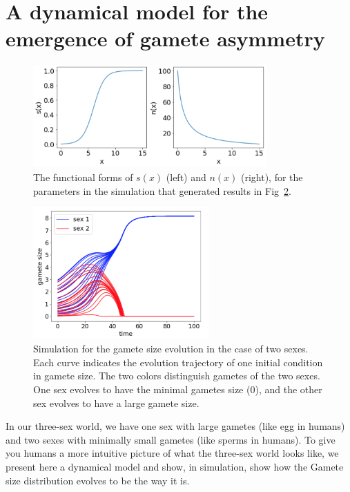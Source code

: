 

\section{A dynamical model for the emergence of gamete asymmetry}


\begin{figure}[htb!]
    \centering
    \includegraphics[width = 0.8\textwidth]{vickysFigs/2_sex_funForm}
    \caption{The functional forms of $s(x)$ (left) and $n(x)$ (right), for the parameters in the simulation that generated results in Fig~\ref{fig:2sexRun1}.}
    \label{fig:2sexFun1}
\end{figure}

\begin{figure}[htb!]
    \centering
    \includegraphics[width = 0.6\textwidth]{vickysFigs/2_sex_run1}
    \caption{Simulation for the gamete size evolution in the case of two sexes. Each curve indicates the evolution trajectory of one initial condition in gamete size. The two colors distinguish gametes of the two sexes. One sex evolves to have the minimal gametes size ($0$), and the other sex evolves to have a large gamete size.}
    \label{fig:2sexRun1}
\end{figure}

In our three-sex world, we have one sex with large gametes (like egg in humans) and two sexes with minimally small gametes (like sperms in humans). To give you humans a more intuitive picture of what the three-sex world looks like, we present here a dynamical model and show, in simulation, show how the Gamete size distribution evolves to be the way it is. 

